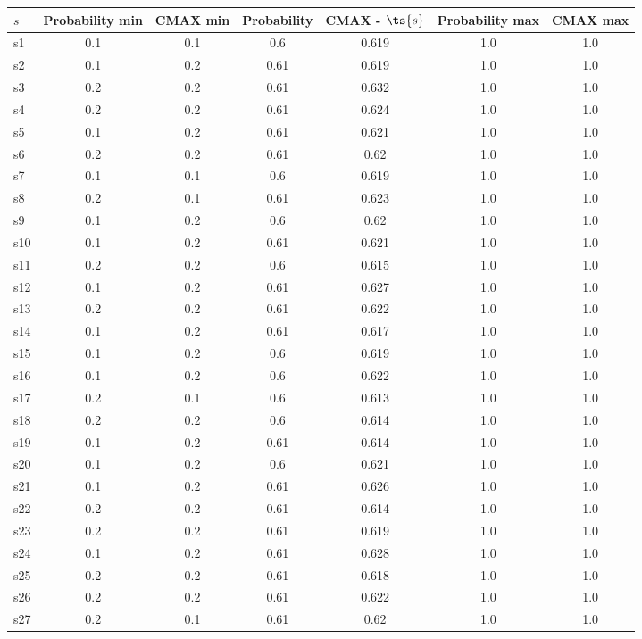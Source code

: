 \documentclass{article}
\begin{document}
\noindent\begin{tabular}{|l|c|c|c|c|c|c|}
\hline
$s$& Probability min & CMAX min & Probability & CMAX - $\ts{s}$ & Probability max & CMAX max\\
\hline
s1 &0.1 & 0.1 & 0.6 & 0.619 & 1.0 & 1.0\\
\hline
s2 &0.1 & 0.2 & 0.61 & 0.619 & 1.0 & 1.0\\
\hline
s3 &0.2 & 0.2 & 0.61 & 0.632 & 1.0 & 1.0\\
\hline
s4 &0.2 & 0.2 & 0.61 & 0.624 & 1.0 & 1.0\\
\hline
s5 &0.1 & 0.2 & 0.61 & 0.621 & 1.0 & 1.0\\
\hline
s6 &0.2 & 0.2 & 0.61 & 0.62 & 1.0 & 1.0\\
\hline
s7 &0.1 & 0.1 & 0.6 & 0.619 & 1.0 & 1.0\\
\hline
s8 &0.2 & 0.1 & 0.61 & 0.623 & 1.0 & 1.0\\
\hline
s9 &0.1 & 0.2 & 0.6 & 0.62 & 1.0 & 1.0\\
\hline
s10 &0.1 & 0.2 & 0.61 & 0.621 & 1.0 & 1.0\\
\hline
s11 &0.2 & 0.2 & 0.6 & 0.615 & 1.0 & 1.0\\
\hline
s12 &0.1 & 0.2 & 0.61 & 0.627 & 1.0 & 1.0\\
\hline
s13 &0.2 & 0.2 & 0.61 & 0.622 & 1.0 & 1.0\\
\hline
s14 &0.1 & 0.2 & 0.61 & 0.617 & 1.0 & 1.0\\
\hline
s15 &0.1 & 0.2 & 0.6 & 0.619 & 1.0 & 1.0\\
\hline
s16 &0.1 & 0.2 & 0.6 & 0.622 & 1.0 & 1.0\\
\hline
s17 &0.2 & 0.1 & 0.6 & 0.613 & 1.0 & 1.0\\
\hline
s18 &0.2 & 0.2 & 0.6 & 0.614 & 1.0 & 1.0\\
\hline
s19 &0.1 & 0.2 & 0.61 & 0.614 & 1.0 & 1.0\\
\hline
s20 &0.1 & 0.2 & 0.6 & 0.621 & 1.0 & 1.0\\
\hline
s21 &0.1 & 0.2 & 0.61 & 0.626 & 1.0 & 1.0\\
\hline
s22 &0.2 & 0.2 & 0.61 & 0.614 & 1.0 & 1.0\\
\hline
s23 &0.2 & 0.2 & 0.61 & 0.619 & 1.0 & 1.0\\
\hline
s24 &0.1 & 0.2 & 0.61 & 0.628 & 1.0 & 1.0\\
\hline
s25 &0.2 & 0.2 & 0.61 & 0.618 & 1.0 & 1.0\\
\hline
s26 &0.2 & 0.2 & 0.61 & 0.622 & 1.0 & 1.0\\
\hline
s27 &0.2 & 0.1 & 0.61 & 0.62 & 1.0 & 1.0\\

\end{tabular}
\end{document}
